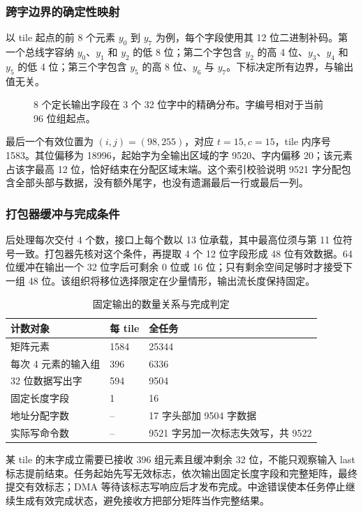 \subsubsection{跨字边界的确定性映射}
以 tile 起点的前 8 个元素 $y_0$ 到 $y_7$ 为例，每个字段使用其 12 位二进制补码。第一个总线字容纳 $y_0$、$y_1$ 和 $y_2$ 的低 8 位；第二个字包含 $y_2$ 的高 4 位、$y_3$、$y_4$ 和 $y_5$ 的低 4 位；第三个字包含 $y_5$ 的高 8 位、$y_6$ 与 $y_7$。下标决定所有边界，与输出值无关。

\begin{figure}[H]\centering
{}
\caption{8 个定长输出字段在 3 个 32 位字中的精确分布。字编号相对于当前 96 位组起点。}
\end{figure}

最后一个有效位置为 $(i,j)=(98,255)$，对应 $t=15,c=15$，tile 内序号 1583。其位偏移为 18996，起始字为全输出区域的字 9520、字内偏移 20；该元素占该字最高 12 位，恰好结束在分配区域末端。这个索引校验说明 9521 字分配包含全部头部与数据，没有额外尾字，也没有遗漏最后一行或最后一列。

\subsubsection{打包器缓冲与完成条件}
后处理每次交付 4 个数，接口上每个数以 13 位承载，其中最高位须与第 11 位符号一致。打包器先核对这个条件，再提取 4 个 12 位字段形成 48 位有效数据。64 位缓冲在输出一个 32 位字后可剩余 0 位或 16 位；只有剩余空间足够时才接受下一组 48 位。该组织将移位选择限定在少量情形，输出流长度保持固定。

\begin{table}[H]\centering\small
\caption{固定输出的数量关系与完成判定}
\begin{tabularx}{\linewidth}{p{42mm}p{32mm}Y}\toprule
计数对象 & 每 tile & 全任务\\\midrule
矩阵元素 & 1584 & 25344\\
每次 4 元素的输入组 & 396 & 6336\\
32 位数据写出字 & 594 & 9504\\
固定长度字段 & 1 & 16\\
地址分配字数 & -- & 17 字头部加 9504 字数据\\
实际写命令数 & -- & 9521 字另加一次标志失效写，共 9522\\\bottomrule
\end{tabularx}
\end{table}

某 tile 的末字成立需要已接收 396 组元素且缓冲剩余 32 位，不能只观察输入 last 标志提前结束。任务起始先写无效标志，依次输出固定长度字段和完整矩阵，最终提交有效标志；DMA 等待该标志写响应后才发布完成。中途错误使本任务停止继续生成有效完成状态，避免接收方把部分矩阵当作完整结果。
